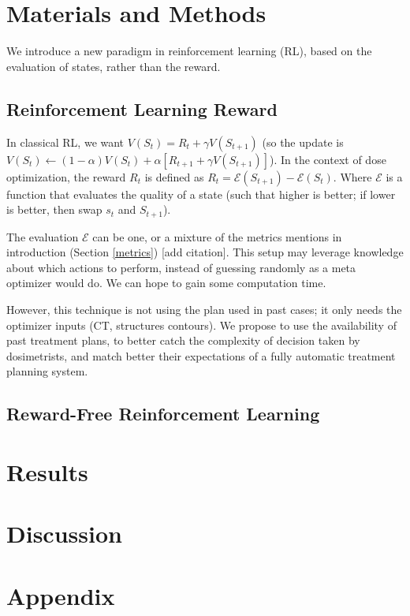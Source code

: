 \section{Materials and Methods}
We introduce a new paradigm in reinforcement learning (RL), based on the evaluation of states, rather than the reward.

\subsection{Reinforcement Learning Reward}
In classical RL, we want $V(S_t) = R_t + \gamma V(S_{t+1})$
(so the update is $V(S_t) \leftarrow (1-\alpha) V(S_t) + \alpha \left[ R_{t+1} + \gamma V(S_{t+1}) \right]$).
In the context of dose optimization, the reward $R_t$ is defined as $R_t = \mathcal{E}(S_{t+1}) - \mathcal{E}(S_t)$.
Where $\mathcal{E}$ is a function that evaluates the quality of a state (such that higher is better; if lower is better, then swap $s_t$ and $S_{t+1}$).

The evaluation $\mathcal{E}$ can be one, or a mixture of the metrics mentions in introduction (Section \ref{metrics}) [add citation].
This setup may leverage knowledge about which actions to perform, instead of guessing randomly as a meta optimizer would do.
We can hope to gain some computation time.

However, this technique is not using the plan used in past cases; it only needs the optimizer inputs (CT, structures contours).
We propose to use the availability of past treatment plans, to better catch the complexity of decision taken by dosimetrists, and match better their expectations of a fully automatic treatment planning system.



\subsection{Reward-Free Reinforcement Learning}


\section{Results}

\section{Discussion}



\section*{Appendix}

